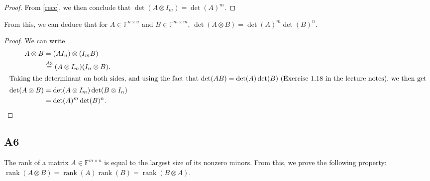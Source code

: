 \documentclass[11pt]{article}
\DeclareMathOperator{\rank}{rank}
\newcommand{\field}{\mathbb{F}} %
\newcommand{\kp}{\otimes} %
\begin{document}
\begin{proof}
From \eqref{recc}, we then conclude that \(\det(A \kp I_m) = \det(A)^m\).
\end{proof}

From this, we can deduce that for \(A \in \field^{n \times n}\) and \(B \in \field^{m \times m}\), \(\det(A \kp B) = \det(A)^m \det(B)^n\).
\begin{proof}
    We can write
    \begin{align*}
    A \kp B &= (A I_n) \kp (I_m B)\\
    &\overset{A3}{=} (A \kp I_m) (I_n \kp B).\\
    \intertext{Taking the determinant on both sides, and using the fact that 
        \(\det(AB) = \det(A)\det(B)\) (Exercise~1.18 in the lecture notes), we then get}
    \det(A \kp B) &= \det(A \kp I_m) \det(B \kp I_n)\\
    &= \det(A)^m \det(B)^n.\qedhere
    \end{align*}
\end{proof}

\subsection*{A6}
The rank of a matrix \(A \in \field^{m \times n}\) is equal to the largest size of its nonzero minors.
From this, we prove the following property: $\rank(A\kp B)=\rank(A)\rank(B)=\rank(B\kp A)$.
\end{document}
